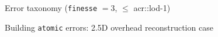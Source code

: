 \documentclass[10pt]{beamer}
\begin{document}
        \begin{frame}{Error taxonomy (\texttt{finesse} $= 3$, $\leq$ \acrshort{acr::lod}-1)}
            
        \end{frame}
        \begin{frame}{Building \texttt{atomic} errors: 2.5D overhead reconstruction case}
        \end{frame}
\end{document}
